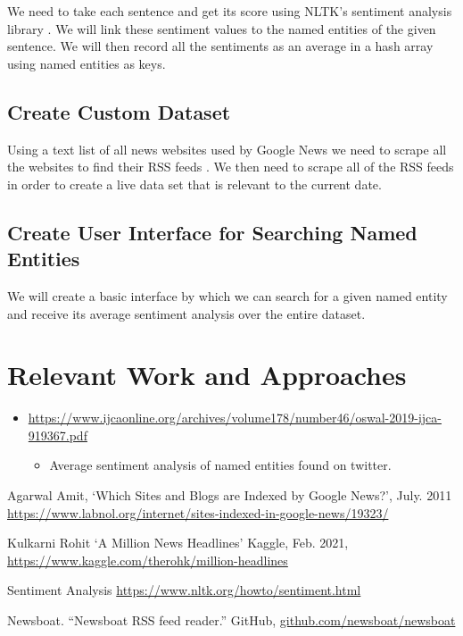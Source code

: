 \documentclass[12pt]{article}
\begin{document}
We need to take each sentence and get its score using NLTK's sentiment analysis library \cite{Sentiment}. We will link these sentiment values to the named entities of the given sentence. We will then record all the sentiments as an average in a hash array using named entities as keys.

\subsection{Create Custom Dataset}

Using a text list of all news websites used by Google News we need to scrape all the websites to find their RSS feeds \cite{GoogleNewsBlog}. We then need to scrape all of the RSS feeds in order to create a live data set that is relevant to the current date.

\subsection{Create User Interface for Searching Named Entities}

We will create a basic interface by which we can search for a given named entity and receive its average sentiment analysis over the entire dataset.

\section{Relevant Work and Approaches}

\begin{itemize}
\item{ \url{https://www.ijcaonline.org/archives/volume178/number46/oswal-2019-ijca-919367.pdf} }
\begin{itemize}
\item Average sentiment analysis of named entities found on twitter.
\end{itemize}
\end{itemize}

\begin{thebibliography}{10}

 Agarwal Amit, `Which Sites and Blogs are Indexed by Google News?', July. 2011 \url{https://www.labnol.org/internet/sites-indexed-in-google-news/19323/}

 Kulkarni Rohit `A Million News Headlines' Kaggle, Feb. 2021, \url{https://www.kaggle.com/therohk/million-headlines}

 Sentiment Analysis \url{https://www.nltk.org/howto/sentiment.html}

 Newsboat. “Newsboat RSS feed reader.” GitHub, \url{github.com/newsboat/newsboat}



\end{thebibliography}
\end{document}

